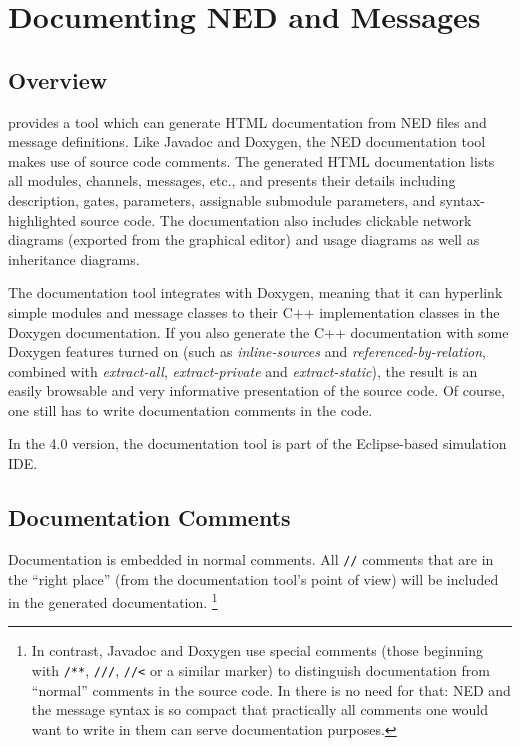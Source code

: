 \chapter{Documenting NED and Messages}
\label{cha:neddoc}

\section{Overview}

{\opp} provides a tool which can generate HTML documentation from NED files
and message definitions. Like Javadoc and Doxygen, the NED documentation tool
makes use of source code comments. The generated HTML documentation
lists all modules, channels, messages, etc., and presents their details including
description, gates, parameters, assignable submodule parameters, and
syntax-highlighted source code. The documentation also includes clickable
network diagrams (exported from the graphical editor) and usage diagrams as
well as inheritance diagrams.

The documentation tool integrates with Doxygen, meaning that it can
hyperlink simple modules and message classes to their C++ implementation
classes in the Doxygen documentation. If you also generate the C++
documentation with some Doxygen features turned on (such as
\textit{inline-sources} and \textit{referenced-by-relation}, combined with
\textit{extract-all}, \textit{extract-private} and
\textit{extract-static}), the result is an easily browsable and very
informative presentation of the source code. Of course, one still has to
write documentation comments in the code.

In the 4.0 version, the documentation tool is part of the Eclipse-based
simulation IDE.


\section{Documentation Comments}

Documentation is embedded in normal comments. All \texttt{//} comments
that are in the ``right place'' (from the documentation tool's
point of view) will be included in the generated documentation.
  \footnote{In contrast, Javadoc and Doxygen use special comments (those
     beginning with \texttt{/**}, \texttt{///}, \texttt{//<} or a similar
     marker) to distinguish documentation from ``normal'' comments in the
     source code. In {\opp} there is no need for that: NED and the message
     syntax is so compact that practically all comments one would want to write
     in them can serve documentation purposes.}


